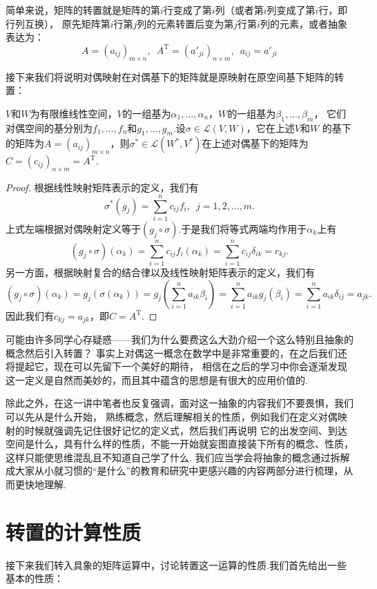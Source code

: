 简单来说，矩阵的转置就是矩阵的第$i$行变成了第$i$列（或者第$i$列变成了第$i$行，即行列互换），
原先矩阵第$i$行第$j$列的元素转置后变为第$j$行第$i$列的元素，或者抽象表达为：
\[A=(a_{ij})_{m \times n},\enspace A^\mathrm{T}=(a'_{ji})_{n \times m},\enspace a_{ij}=a'_{ji}\]

接下来我们将说明对偶映射在对偶基下的矩阵就是原映射在原空间基下矩阵的转置：
\begin{theorem}
    $V$和$W$为有限维线性空间，$V$的一组基为$\alpha_1,\ldots,\alpha_n$，$W$的一组基为$\beta_1,\ldots,\beta_m$，
    它们对偶空间的基分别为$f_1,\ldots,f_n$和$g_1,\ldots,g_m$.设$\sigma\in\mathcal{L}(V,W)$，它在上述$V$和$W$
    的基下的矩阵为$A=(a_{ij})_{m \times n}$，则$\sigma^*\in\mathcal{L}(W^*,V^*)$在上述对偶基下的矩阵为
    $C=(c_{ij})_{n \times m}=A^\mathrm{T}$.
\end{theorem}
\begin{proof}
    根据线性映射矩阵表示的定义，我们有
    \[\sigma^*(g_j)=\sum\limits_{i=1}^nc_{ij}f_i,\enspace j=1,2,\ldots,m.\]
    上式左端根据对偶映射定义等于$(g_j\circ\sigma)$.于是我们将等式两端均作用于$\alpha_k$上有
    \[(g_j\circ\sigma)(\alpha_k)=\sum\limits_{i=1}^nc_{ij}f_i(\alpha_k)=\sum\limits_{i=1}^nc_{ij}\delta_{ik}=c_{kj}.\]
    另一方面，根据映射复合的结合律以及线性映射矩阵表示的定义，我们有
    \[(g_j\circ\sigma)(\alpha_k)=g_j(\sigma(\alpha_k))=g_j\left(\sum\limits_{i=1}^na_{ik}\beta_i\right)=\sum\limits_{i=1}^na_{ik}g_j(\beta_i)=\sum\limits_{i=1}^na_{ik}\delta_{ij}=a_{jk}.\]
    因此我们有$c_{kj}=a_{jk}$，即$C=A^\mathrm{T}$.
\end{proof}

可能由许多同学心存疑惑——我们为什么要费这么大劲介绍一个这么特别且抽象的概念然后引入转置？
事实上对偶这一概念在数学中是非常重要的，在之后我们还将提起它，现在可以先留下一个美好的期待，
相信在之后的学习中你会逐渐发现这一定义是自然而美妙的，而且其中蕴含的思想是有很大的应用价值的.

除此之外，在这一讲中笔者也反复强调，面对这一抽象的内容我们不要畏惧，我们可以先从是什么开始，
熟练概念，然后理解相关的性质，例如我们在定义对偶映射的时候就强调先记住很好记忆的定义式，然后我们再说明
它的出发空间、到达空间是什么，具有什么样的性质，不能一开始就妄图直接装下所有的概念、性质，这样只能使思维混乱且不知道自己学了什么.
我们应当学会将抽象的概念通过拆解成大家从小就习惯的``是什么''的教育和研究中更感兴趣的内容两部分进行梳理，从而更快地理解.

\section{转置的计算性质}
接下来我们转入具象的矩阵运算中，讨论转置这一运算的性质.我们首先给出一些基本的性质：
